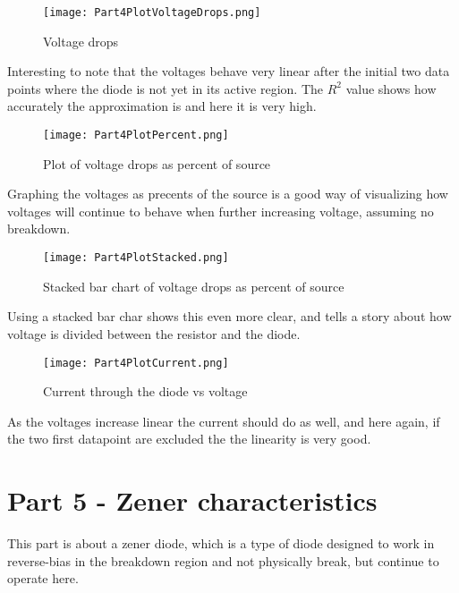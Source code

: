 \documentclass{article}
\begin{document}
\begin{figure}[h] %
\centering
\texttt{[image: Part4PlotVoltageDrops.png]}
\caption{Voltage drops}
\label{fig:part4voltage}
\end{figure}
Interesting to note that the voltages behave very linear after the initial two data points where the diode is not yet in its active region. The \(R^2\) value shows how accurately the approximation is and here it is very high.
\clearpage


\begin{figure}[h] %
\centering
\texttt{[image: Part4PlotPercent.png]}
\caption{Plot of voltage drops as percent of source}
\label{fig:part4percent}
\end{figure}
Graphing the voltages as precents of the source is a good way of visualizing how voltages will continue to behave when further increasing voltage, assuming no breakdown.
\clearpage


\begin{figure}[h] %
\centering
\texttt{[image: Part4PlotStacked.png]}
\caption{Stacked bar chart of voltage drops as percent of source}
\label{fig:part4stacked}
\end{figure}
Using a stacked bar char shows this even more clear, and tells a story about how voltage is divided between the resistor and the diode.
\clearpage


\begin{figure}[h] %
\centering
\texttt{[image: Part4PlotCurrent.png]}
\caption{Current through the diode vs voltage}
\label{fig:part4current}
\end{figure}
As the voltages increase linear the current should do as well, and here again, if the two first datapoint are excluded the the linearity is very good.



\section{Part 5 - Zener characteristics}
This part is about a zener diode, which is a type of diode designed to work in reverse-bias in the breakdown region and not physically break, but continue to operate here.
\end{document}
